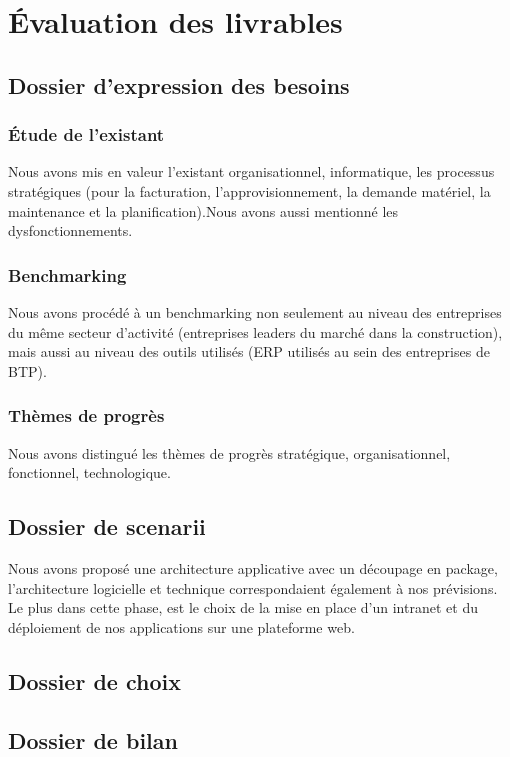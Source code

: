 \section{Évaluation des livrables}
       \subsection{Dossier d'expression des besoins}
              \subsubsection{Étude de l'existant}
Nous avons mis en valeur l'existant organisationnel, informatique, les processus stratégiques (pour la facturation, l'approvisionnement, la demande matériel, la maintenance et la planification).Nous avons aussi mentionné les dysfonctionnements.

              \subsubsection{Benchmarking}
Nous avons procédé à un benchmarking non seulement au niveau des entreprises du même secteur d'activité (entreprises leaders du marché dans la construction), mais aussi au niveau des outils utilisés (ERP utilisés au sein des entreprises de BTP).

              \subsubsection{Thèmes de progrès}
Nous avons distingué les thèmes de progrès stratégique, organisationnel, fonctionnel, technologique.

       \subsection{Dossier de scenarii}
Nous avons proposé une architecture applicative avec un découpage en package, l'architecture logicielle et technique correspondaient également à nos prévisions. Le plus dans cette phase, est le choix de la mise en place d'un intranet et du déploiement de nos applications sur une plateforme web.

       \subsection{Dossier de choix}


       \subsection{Dossier de bilan}


